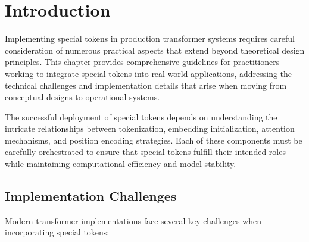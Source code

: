 
\section{Introduction}

Implementing special tokens in production transformer systems requires careful consideration of numerous practical aspects that extend beyond theoretical design principles. This chapter provides comprehensive guidelines for practitioners working to integrate special tokens into real-world applications, addressing the technical challenges and implementation details that arise when moving from conceptual designs to operational systems.
\begin{comment}
Feedback: This is a strong opening. To make it even more compelling, you could frame it as the "nuts and bolts" chapter. For example: "This chapter bridges the gap between the 'what' and the 'how.' Having explored the high-level design and training principles, we now dive into the practical, rubber-meets-the-road details of implementation. This is where theoretical designs become working code, and where subtle implementation choices can make the difference between a successful deployment and a failed experiment."
\end{comment}

The successful deployment of special tokens depends on understanding the intricate relationships between tokenization, embedding initialization, attention mechanisms, and position encoding strategies. Each of these components must be carefully orchestrated to ensure that special tokens fulfill their intended roles while maintaining computational efficiency and model stability.

\subsection{Implementation Challenges}

Modern transformer implementations face several key challenges when incorporating special tokens:

